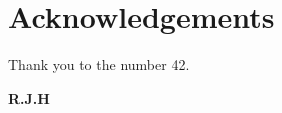 \thispagestyle{empty}
\section*{Acknowledgements}
Thank you to the number 42.
\begin{flushright}
\textbf{R.J.H} %
\end{flushright}


